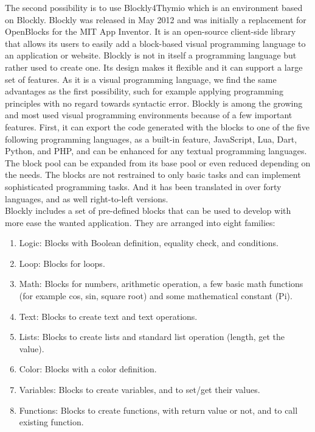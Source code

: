 \documentclass{scrartcl}
\begin{document}
The second possibility is to use Blockly4Thymio which is an environment based on Blockly. Blockly was released in May 2012 and was initially a replacement for OpenBlocks for the MIT App Inventor. 
It is an open-source client-side library that allows its users to easily add a block-based visual programming language to an application or website. 
Blockly is not in itself a programming language but rather used to create one. Its design makes it flexible and it can support a large set of features. 
As it is a visual programming language, we find the same advantages as the first possibility, such for example applying programming principles with no regard towards syntactic error.
Blockly is among the growing and most used visual programming environments because of a few important features. First, it can export the code generated with the blocks to one of the five following programming languages, 
as a built-in feature, JavaScript, Lua, Dart, Python, and PHP, and can be enhanced for any textual programming languages. 
The block pool can be expanded from its base pool or even reduced depending on the needs. The blocks are not restrained to only basic tasks and can implement sophisticated programming tasks. 
And it has been translated in over forty languages, and as well right-to-left versions. \\

Blockly includes a set of pre-defined blocks that can be used to develop with more ease the wanted application. They are arranged into eight families:
\begin{enumerate}
  \item Logic: Blocks with Boolean definition, equality check, and conditions.
  \item Loop: Blocks for loops.
  \item Math: Blocks for numbers, arithmetic operation, a few basic math functions (for example cos, sin, square root) and some mathematical constant (Pi).
  \item Text: Blocks to create text and text operations.
  \item Lists: Blocks to create lists and standard list operation (length, get the value).
  \item Color: Blocks with a color definition.
  \item Variables: Blocks to create variables, and to set/get their values.
  \item Functions: Blocks to create functions, with return value or not, and to call existing function.
\end{enumerate}
\end{document}
